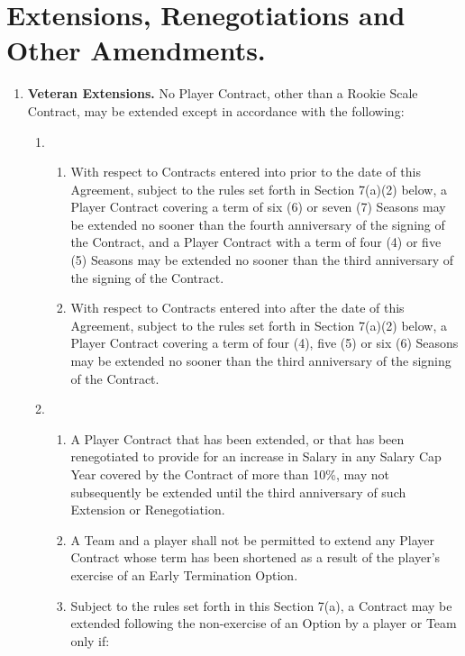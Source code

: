 \documentclass[
]{book}
\providecommand{\tightlist}{%
  \setlength{\itemsep}{0pt}\setlength{\parskip}{0pt}}
\begin{document}
\hypertarget{extensions-renegotiations-and-other-amendments.}{%
\section{Extensions, Renegotiations and Other Amendments.}\label{extensions-renegotiations-and-other-amendments.}}

\begin{enumerate}
\def\labelenumi{(\alph{enumi})}
\tightlist
\item
  \textbf{Veteran Extensions.} No Player Contract, other than a Rookie Scale Contract, may be extended except in accordance with the following:

  \begin{enumerate}
  \def\labelenumii{(\arabic{enumii})}
  \item
    \begin{enumerate}
    \def\labelenumiii{(\roman{enumiii})}
    \tightlist
    \item
      With respect to Contracts entered into prior to the date of this Agreement, subject to the rules set forth in Section 7(a)(2) below, a Player Contract covering a term of six (6) or seven (7) Seasons may be extended no sooner than the fourth anniversary of the signing of the Contract, and a Player Contract with a term of four (4) or five (5) Seasons may be extended no sooner than the third anniversary of the signing of the Contract.
    \item
      With respect to Contracts entered into after the date of this Agreement, subject to the rules set forth in Section 7(a)(2) below, a Player Contract covering a term of four (4), five (5) or six (6) Seasons may be extended no sooner than the third anniversary of the signing of the Contract.
    \end{enumerate}
  \item
    \begin{enumerate}
    \def\labelenumiii{(\roman{enumiii})}
    \tightlist
    \item
      A Player Contract that has been extended, or that has been renegotiated to provide for an increase in Salary in any Salary Cap Year covered by the Contract of more than 10\%, may not subsequently be extended until the third anniversary of such Extension or Renegotiation.
    \item
      A Team and a player shall not be permitted to extend any Player Contract whose term has been shortened as a result of the player's exercise of an Early Termination Option.
    \item
      Subject to the rules set forth in this Section 7(a), a Contract may be extended following the non-exercise of an Option by a player or Team only if:


\end{enumerate}
\end{enumerate}
\end{enumerate}
\end{document}

